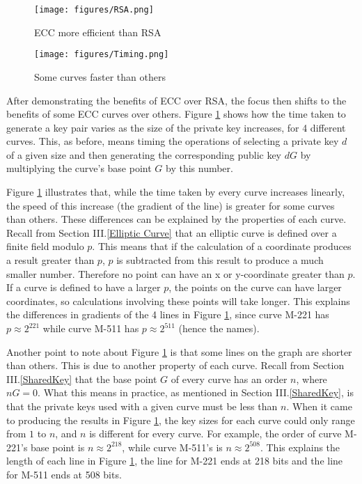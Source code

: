 \documentclass[12pt,a4paper]{article}
\begin{document}
\begin{figure}[!htb]
    \begin{minipage}{0.5\textwidth}
        \centering
        \texttt{[image: figures/RSA.png]}
        \caption{ECC more efficient than RSA}
        \label{fig:rsa}
    \end{minipage}\hfill
    \begin{minipage}{0.5\textwidth}
        \centering
        \texttt{[image: figures/Timing.png]}
        \caption{Some curves faster than others}
        \label{fig:curves}
    \end{minipage}
\end{figure}

After demonstrating the benefits of ECC over RSA, the focus then shifts to the benefits of some ECC curves over others. 
Figure \ref{fig:curves} shows how the time taken to generate a key pair varies as the size of the private key increases, for 4 different curves. 
This, as before, means timing the operations of selecting a private key $d$ of a given size and then generating the corresponding public key $dG$ by 
multiplying the curve's base point $G$ by this number. 

Figure \ref{fig:curves} illustrates that, while the time taken by every curve increases linearly, 
the speed of this increase (the gradient of the line) is greater for some curves than others. 
These differences can be explained by the properties of each curve. 
Recall from Section III.\ref{Elliptic Curve} that an elliptic curve is defined over a finite field modulo $p$. 
This means that if the calculation of a coordinate produces a result greater than $p$, $p$ is subtracted from this result to produce a much smaller number. 
Therefore no point can have an x or y-coordinate greater than $p$. 
If a curve is defined to have a larger $p$, the points on the curve can have larger coordinates, 
so calculations involving these points will take longer. 
This explains the differences in gradients of the 4 lines in Figure \ref{fig:curves}, 
since curve M-221 has $p \approx 2^{221}$ while curve M-511 has $p \approx 2^{511}$ (hence the names). 

Another point to note about Figure \ref{fig:curves} is that some lines on the graph are shorter than others. 
This is due to another property of each curve. 
Recall from Section III.\ref{SharedKey} that the base point $G$ of every curve has an order $n$, where $nG=0$. 
What this means in practice, as mentioned in Section III.\ref{SharedKey}, 
is that the private keys used with a given curve must be less than $n$. 
When it came to producing the results in Figure \ref{fig:curves}, the key sizes for each curve could only range from $1$ to $n$, 
and $n$ is different for every curve. 
For example, the order of curve M-221's base point is $n \approx 2^{218}$, while curve M-511's is $n \approx 2^{508}$. 
This explains the length of each line in Figure \ref{fig:curves}, the line for M-221 ends at 218 bits and the line for M-511 ends at 508 bits. 
\end{document}
